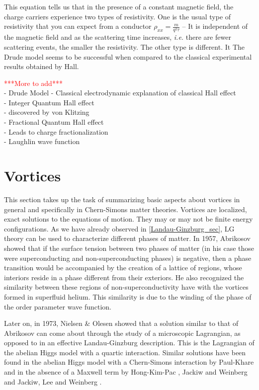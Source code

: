          This equation tells us that in the presence of a constant magnetic field, the charge carriers experience two types of resistivity. One is the usual type of resistivity that you can expect from a conductor $\rho_{xx} = \frac{m}{q^2\tau}$ -- It is independent of the magnetic field and as the scattering time increases, \textit{i.e.} there are fewer scattering events, the smaller the resistivity. The other type is different. It 
        The Drude model seems to be successful when compared to the classical experimental results obtained by Hall. 

\textcolor{red}{***More to add***}\\
        - Drude Model
        - Classical electrodynamic explanation of classical Hall effect\\
        - Integer Quantum Hall effect \\
   \indent         - discovered by von Klitzing\\
        - Fractional Quantum Hall effect\\
    \indent        - Leads to charge fractionalization\\
           \indent - Laughlin wave function
        \section{Vortices} \label{vortices_sec}
        This section takes up the task of summarizing basic aspects about vortices in general and specifically in Chern-Simons matter theories.
        Vortices are localized, exact solutions to the equations of motion. They may or may not be finite energy configurations.
        As we have already observed in \ref{Landau-Ginzburg_sec}, LG theory can be used to characterize different phases of matter. In 1957, Abrikosov showed that if the surface tension between two phases of matter (in his case those were superconducting and non-superconducting phases) is negative, then a phase transition would be accompanied by the creation of a lattice of regions, whose interiors reside in a phase different from their exteriors. He also recognized the similarity between these regions of non-superconductivity have with the vortices formed in superfluid helium. This similarity is due to the winding of the phase of the order parameter wave function.

        Later on, in 1973, Nielsen \& Olesen \cite{Nielsen1973} showed that a solution similar to that of Abrikosov can come about through the study of a microscopic Lagrangian, as opposed to in an effective Landau-Ginzburg description. This is the Lagrangian of the abelian Higgs model with a quartic interaction. Similar solutions have been found in the abelian Higgs model with a Chern-Simons interaction by Paul-Khare \cite{Paul1986} and in the absence of a Maxwell term by Hong-Kim-Pac \cite{Hong1990}, Jackiw and Weinberg \cite{Jackiw1990a} and Jackiw, Lee and Weinberg \cite{Jackiw1990b}.

